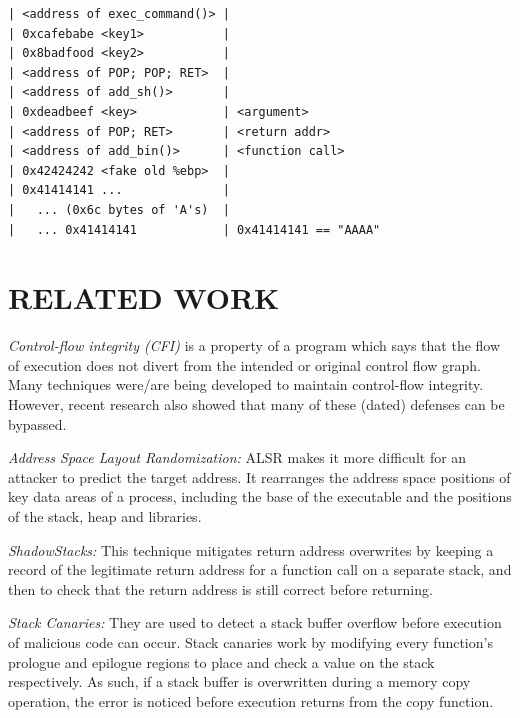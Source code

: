 \documentclass[10pt,twocolumn]{article}
\begin{document}


\begin{lstlisting}[float,aboveskip=\bigskipamount,belowskip=\medskipamount,caption=Stack
prepared with a ROP chain]
| <address of exec_command()> |
| 0xcafebabe <key1>           |
| 0x8badfood <key2>           |
| <address of POP; POP; RET>  |
| <address of add_sh()>       |
| 0xdeadbeef <key>            | <argument>
| <address of POP; RET>       | <return addr>
| <address of add_bin()>      | <function call>
| 0x42424242 <fake old %ebp>  |
| 0x41414141 ...              |
|   ... (0x6c bytes of 'A's)  |
|   ... 0x41414141            | 0x41414141 == "AAAA"
\end{lstlisting}


\section{RELATED WORK}

\textit{Control-flow integrity (CFI)\cite{mulder_subject_2016}} is a property
of a program which says that the flow of execution does not divert from the
intended or original control flow graph. Many techniques were/are being
developed to maintain control-flow integrity. However, recent research also
showed that many of these (dated) defenses can be bypassed.

\textit{Address Space Layout Randomization:} ALSR makes it more difficult for
an attacker to predict the target address. It rearranges the address space
positions of key data areas of a process, including the base of the executable
and the positions of the stack, heap and libraries.

\textit{ShadowStacks:} This technique mitigates return address overwrites by
keeping a record of the legitimate return address for a function call on a
separate stack, and then to check that the return address is still correct
before returning.

\textit{Stack Canaries:} They are used to detect a stack buffer overflow before
execution of malicious code can occur. Stack canaries work by modifying every
function's prologue and epilogue regions to place and check a value on the
stack respectively. As such, if a stack buffer is overwritten during a memory
copy operation, the error is noticed before execution returns from the copy
function.
\end{document}
